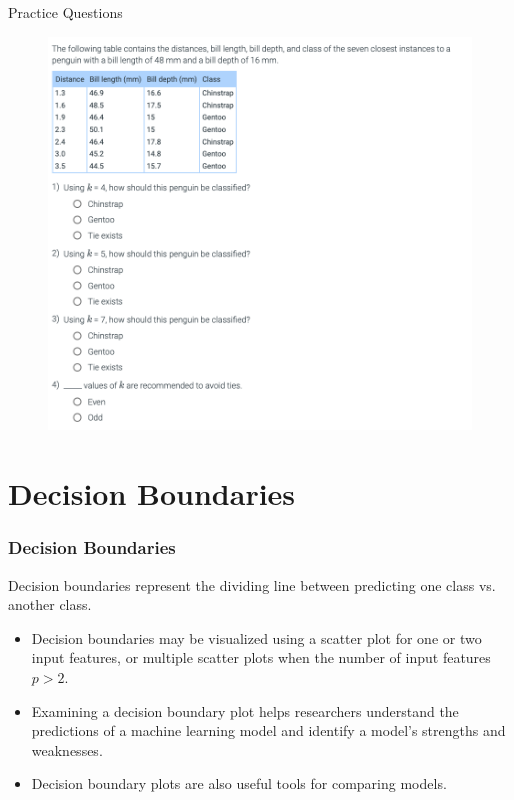 \documentclass[8pt,dvipsnames]{beamer}
\begin{document}
\begin{frame}{Practice Questions}
	\begin{figure}[ht]
		\centering
		\includegraphics[scale=0.25]{imgs/knn_28.png}
	\end{figure}
\end{frame}

\section{Decision Boundaries}
\begin{frame}
	\frametitle{Decision Boundaries}
	Decision boundaries represent the dividing line between predicting one class vs. another class.
	\begin{itemize}
		\item Decision boundaries may be visualized using a scatter plot for one or two input features, or multiple scatter plots when the number of input features \(p>2\).
		\item Examining a decision boundary plot helps researchers understand the predictions of a machine learning model and
		      identify a model's strengths and weaknesses.
		\item Decision boundary plots are also useful tools for comparing models.
	\end{itemize}
\end{frame}
\end{document}
